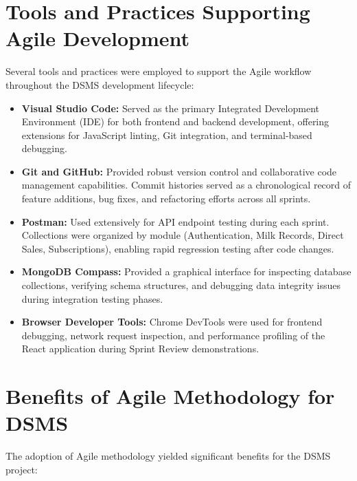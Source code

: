 \documentclass[12pt,a4paper]{report}
\begin{document}
\section{Tools and Practices Supporting Agile Development}
\vspace{0.5cm}
Several tools and practices were employed to support the Agile workflow throughout the DSMS development lifecycle:

\begin{itemize}
    \item \textbf{Visual Studio Code:} Served as the primary Integrated Development Environment (IDE) for both frontend and backend development, offering extensions for JavaScript linting, Git integration, and terminal-based debugging.
    \item \textbf{Git and GitHub:} Provided robust version control and collaborative code management capabilities. Commit histories served as a chronological record of feature additions, bug fixes, and refactoring efforts across all sprints.
    \item \textbf{Postman:} Used extensively for API endpoint testing during each sprint. Collections were organized by module (Authentication, Milk Records, Direct Sales, Subscriptions), enabling rapid regression testing after code changes.
    \item \textbf{MongoDB Compass:} Provided a graphical interface for inspecting database collections, verifying schema structures, and debugging data integrity issues during integration testing phases.
    \item \textbf{Browser Developer Tools:} Chrome DevTools were used for frontend debugging, network request inspection, and performance profiling of the React application during Sprint Review demonstrations.
\end{itemize}

\section{Benefits of Agile Methodology for DSMS}
\vspace{0.5cm}
The adoption of Agile methodology yielded significant benefits for the DSMS project:
\end{document}
